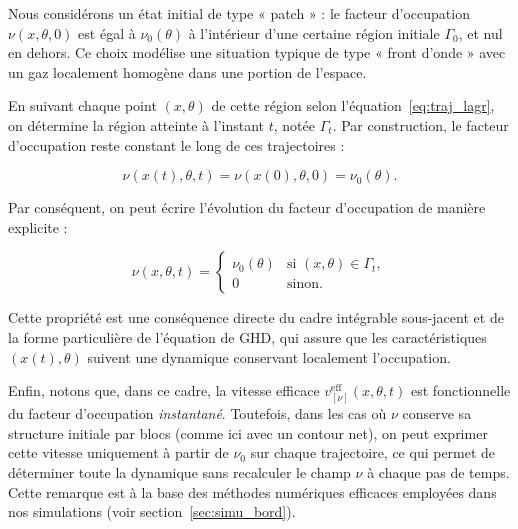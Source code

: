\medskip

Nous considérons un état initial de type « patch » : le facteur d’occupation $\nu(x,\theta,0)$ est égal à $\nu_0(\theta)$ à l’intérieur d’une certaine région initiale $\Gamma_0$, et nul en dehors. Ce choix modélise une situation typique de type « front d’onde » avec un gaz localement homogène dans une portion de l’espace.

En suivant chaque point $(x,\theta)$ de cette région selon l’équation~\eqref{eq:traj_lagr}, on détermine la région atteinte à l’instant $t$, notée $\Gamma_t$. Par construction, le facteur d’occupation reste constant le long de ces trajectoires :

\begin{equation}
\nu(x(t),\theta,t) = \nu(x(0),\theta,0) = \nu_0(\theta).
\end{equation}

Par conséquent, on peut écrire l’évolution du facteur d’occupation de manière explicite :

\begin{equation}
\label{eq:contour_support}
\nu(x, \theta, t) =
\begin{cases}
\nu_0(\theta) & \text{si } (x,\theta) \in \Gamma_t, \\
0 & \text{sinon}.
\end{cases}
\end{equation}

Cette propriété est une conséquence directe du cadre intégrable sous-jacent et de la forme particulière de l’équation de GHD, qui assure que les caractéristiques $(x(t),\theta)$ suivent une dynamique conservant localement l’occupation.

\medskip

Enfin, notons que, dans ce cadre, la vitesse efficace $v^{\mathrm{eff}}_{[\nu]}(x,\theta,t)$ est fonctionnelle du facteur d’occupation \textit{instantané}. Toutefois, dans les cas où $\nu$ conserve sa structure initiale par blocs (comme ici avec un contour net), on peut exprimer cette vitesse uniquement à partir de $\nu_0$ sur chaque trajectoire, ce qui permet de déterminer toute la dynamique sans recalculer le champ $\nu$ à chaque pas de temps. Cette remarque est à la base des méthodes numériques efficaces employées dans nos simulations (voir section~\ref{sec:simu_bord}).

